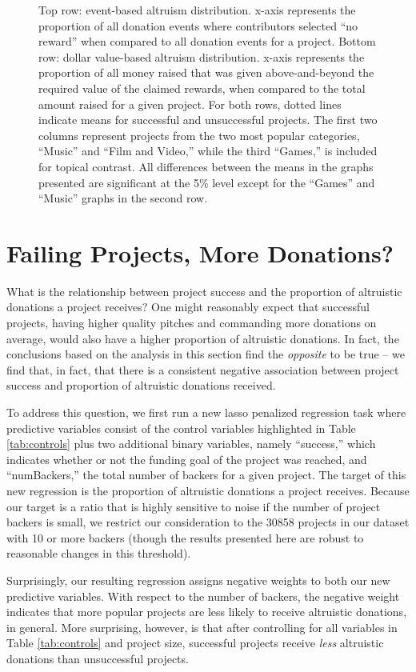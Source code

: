 \documentclass[letterpaper]{article}
\begin{document}
\begin{figure}[t]
{}
\caption{Top row: event-based altruism distribution. x-axis represents the proportion of all donation events where contributors selected ``no reward'' when compared to all donation events for a project. Bottom row: dollar value-based altruism distribution. x-axis represents the proportion of all money raised that was given above-and-beyond the required value of the claimed rewards, when compared to the total amount raised for a given project. For both rows, dotted lines indicate means for successful and unsuccessful projects. The first two columns represent projects from the two most popular categories, ``Music'' and ``Film and Video,'' while the third ``Games,'' is included for topical contrast. All differences between the means in the graphs presented are significant at the 5\% level except for the ``Games'' and ``Music'' graphs in the second row.}
\label{fig:failsucc}
\end{figure}
\section{Failing Projects, More Donations?}
What is the relationship between project success and the proportion of altruistic donations a project receives? One might reasonably expect that successful projects, having higher quality pitches and commanding more donations on average, would also have a higher proportion of altruistic donations. In fact, the conclusions based on the analysis in this section find the \emph{opposite} to be true -- we find that, in fact, that there is a consistent negative association between project success and proportion of altruistic donations received.

To address this question, we first run a new lasso penalized regression task where predictive variables consist of the control variables highlighted in Table \ref{tab:controls} plus two additional binary variables, namely ``success,'' which indicates whether or not the funding goal of the project was reached, and ``numBackers,'' the total number of backers for a given project. The target of this new regression is the proportion of altruistic donations a project receives. Because our target is a ratio that is highly sensitive to noise if the number of project backers is small, we restrict our consideration to the 30858 projects in our dataset with 10 or more backers (though the results presented here are robust to reasonable changes in this threshold).

Surprisingly, our resulting regression assigns negative weights to both our new predictive variables. With respect to the number of backers, the negative weight indicates that more popular projects are less likely to receive altruistic donations, in general. More surprising, however, is that after controlling for all variables in Table \ref{tab:controls} and project size, successful projects receive \emph{less} altruistic donations than unsuccessful projects.
\end{document}
